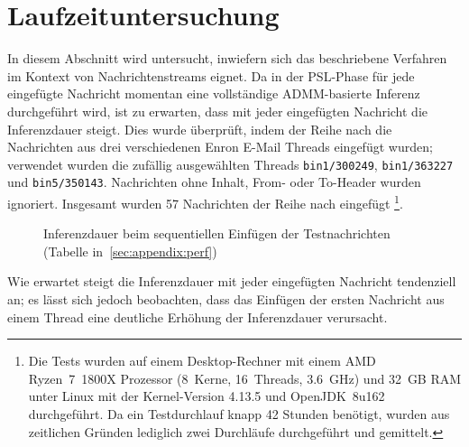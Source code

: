\section{Laufzeituntersuchung}%
\label{sec:evaluation:time}

In diesem Abschnitt wird untersucht, inwiefern sich das beschriebene Verfahren im Kontext von Nachrichtenstreams eignet.
Da in der PSL-Phase für jede eingefügte Nachricht momentan eine vollständige ADMM-basierte Inferenz durchgeführt wird, ist zu erwarten, dass mit jeder eingefügten Nachricht die Inferenzdauer steigt.
Dies wurde überprüft, indem der Reihe nach die Nachrichten aus drei verschiedenen Enron E-Mail Threads eingefügt wurden;
verwendet wurden die zufällig ausgewählten Threads \texttt{bin1/300249}, \texttt{bin1/363227} und \texttt{bin5/350143}.
Nachrichten ohne Inhalt, From- oder To-Header wurden ignoriert.
Insgesamt wurden 57 Nachrichten der Reihe nach eingefügt%
\footnote{Die Tests wurden auf einem Desktop-Rechner mit einem AMD Ryzen~7~1800X Prozessor (8~Kerne, 16~Threads, 3.6~GHz) und 32~GB RAM unter Linux mit der Kernel-Version 4.13.5 und OpenJDK~8u162 durchgeführt.
Da ein Testdurchlauf knapp 42 Stunden benötigt, wurden aus zeitlichen Gründen lediglich zwei Durchläufe durchgeführt und gemittelt.}.
\begin{figure}[h]
	\centering
	\caption{Inferenzdauer beim sequentiellen Einfügen der Testnachrichten (Tabelle in~\ref{sec:appendix:perf})}\label{fig:evaluation:perf}
\end{figure}
Wie erwartet steigt die Inferenzdauer mit jeder eingefügten Nachricht tendenziell an; es lässt sich jedoch beobachten, dass das Einfügen der ersten Nachricht aus einem Thread eine deutliche Erhöhung der Inferenzdauer verursacht.
